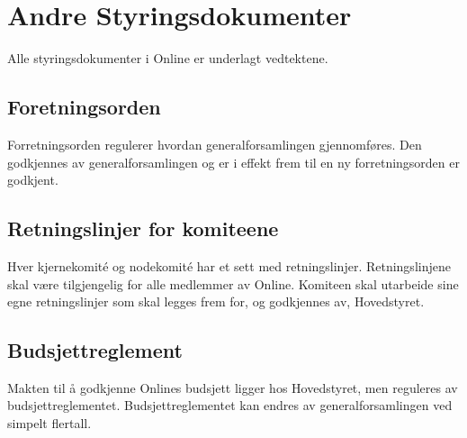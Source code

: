 \chapter{Andre Styringsdokumenter}
\vspace{23pt}

Alle styringsdokumenter i Online er underlagt vedtektene.

\section{Foretningsorden}
\vspace{23pt}

Forretningsorden regulerer hvordan generalforsamlingen gjennomføres. Den godkjennes av generalforsamlingen og er i effekt frem til en ny forretningsorden er godkjent.

\section{Retningslinjer for komiteene}
\vspace{23pt}

Hver kjernekomité og nodekomité har et sett med retningslinjer. Retningslinjene skal være tilgjengelig for alle medlemmer av Online. Komiteen skal utarbeide sine egne retningslinjer som skal legges frem for, og godkjennes av, Hovedstyret.

\section{Budsjettreglement}
\vspace{23pt}

Makten til å godkjenne Onlines budsjett ligger hos Hovedstyret, men reguleres av budsjettreglementet. Budsjettreglementet kan endres av generalforsamlingen ved simpelt flertall.

